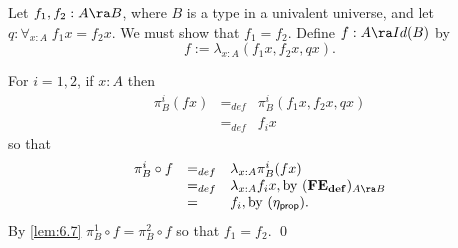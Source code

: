 Let $f_1,f_2:A\ra B$, where $B$ is a type in a univalent universe, and let 
$q:\forall_{x:A}\; f_1x=f_2x$.  We must show that $f_1=f_2$.
Define $f:A\ra Id(B)$ by
  \[ f := \lambda_{x:A}(f_1x,f_2x,qx).\]

For $i=1,2$, if $x:A$ then
  \[\begin{array}{lll}
\pi^i_B(fx)&=_{def}&\pi^i_B(f_1x,f_2x,qx)\\
           &=_{def}& f_ix
  \end{array}\]
so that
  \[\begin{array}{lll}
\pi^i_B\circ f&=_{def}& \lambda_{x:A}\pi^i_B(fx)\\
           &=_{def}& \lambda_{x:A}f_ix,\mbox{by } {\bf (FE_{def}})_{A\ra B}\\
           &=& f_i,\mbox{by }{(\eta_{\sf prop})}.
  \end{array}\]
By \autoref{lem:6.7} $\pi^1_B\circ f = \pi^2_B\circ f$ so that $f_1=f_2$.
\qed

